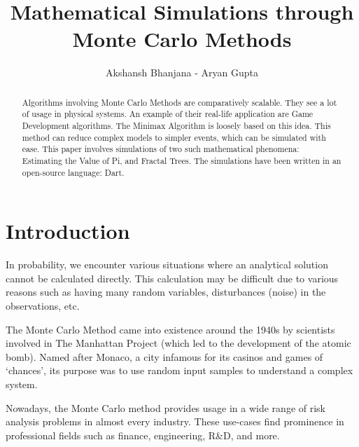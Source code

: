 \documentclass{resonance}
\begin{document}
	
	\title{Mathematical Simulations through Monte Carlo Methods}
	\author{Akshansh Bhanjana - Aryan Gupta}
	
	\maketitle
	
	\begin{abstract}
		Algorithms involving Monte Carlo Methods are comparatively scalable. They see a lot of usage in physical systems. An example of their real-life application are Game Development algorithms. The Minimax Algorithm is loosely based on this idea. This method can reduce complex models to simpler events, which can be simulated with ease. This paper involves simulations of two such mathematical phenomena: Estimating the Value of Pi, and Fractal Trees. The simulations have been written in an open-source language: Dart.
	\end{abstract}
	
	
	
	\section*{Introduction}
	In probability, we encounter various situations where an analytical solution cannot be calculated directly. This calculation may be difficult due to various reasons such as having many random variables, disturbances (noise) in the observations, etc.
	
	The Monte Carlo Method came into existence around the 1940s by scientists involved in The Manhattan Project (which led to the development of the atomic bomb). Named after Monaco, a city infamous for its casinos and games of ‘chances’, its purpose was to use random input samples to understand a complex system. 
	
	Nowadays, the Monte Carlo method provides usage in a wide range of risk analysis problems in almost every industry. These use-cases find prominence in professional fields such as finance, engineering, R\&D, and more.
	
\end{document}
